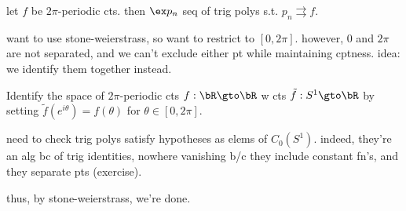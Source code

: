 \begin{thm}
	let $f$ be $2\pi$-periodic cts.
	then $\ex p_{n}$ seq of trig polys s.t. $p_{n}\rightrightarrows f$.
\end{thm}
want to use stone-weierstrass, so want to restrict to $[0,2\pi]$.
however, 0 and $2\pi$ are not separated, and we can't exclude either pt while
maintaining cptness. idea: we identify them together instead.

\newpage
\begin{pf}[source=Primary Source Material]
	Identify the space of $2\pi$-periodic cts $f:\bR\gto\bR$ w cts
	$\tilde{f}:S^{1}\gto\bR$ by setting $\tilde{f}(e^{i\theta})=f(\theta)$ for $\theta\in[0,2\pi]$.

	need to check trig polys satisfy hypotheses as elems of $C_{0}(S^{1})$.
	indeed, they're an alg bc of trig identities, nowhere vanishing b/c they
	include constant fn's, and they separate pts (exercise).

	thus, by stone-weierstrass, we're done.
\end{pf}
